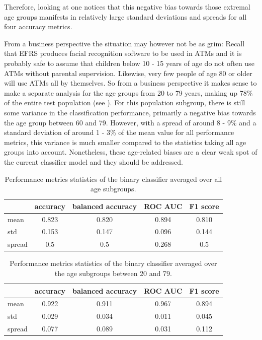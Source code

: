 \documentclass{article}
\begin{document}
Therefore, looking at  one notices that this negative bias towards those extremal age groups manifests in relatively large standard deviations and spreads for all four accuracy metrics.

From a business perspective the situation may however not be as grim: Recall that EFRS produces facial recognition software to be used in ATMs and it is probably safe to assume that children below 10 - 15 years of age do not often use ATMs without parental supervision. Likewise, very few people of age 80 or older will use ATMs all by themselves. So from a business perspective it makes sense to make a separate analysis for the age groups from 20 to 79 years, making up 78\% of the entire test population (see ). For this population subgroup, there is still some variance in the classification performance, primarily a negative bias towards the age group between 60 and 79. However, with a spread of around 8 - 9\% and a standard deviation of around 1 - 3\% of the mean value for all performance metrics, this variance is much smaller compared to the statistics taking all age groups into account. Nonetheless, these age-related biases are a clear weak spot of the current classifier model and they should be addressed.

\begin{table}[h!]
\begin{center}
\caption{Performance metrics statistics of the binary classifier averaged over all age subgroups.}
\label{tab:agestats_all}
\begin{tabular}{| l | c | c | c | c |}
\hline\hline
& accuracy & balanced accuracy & ROC AUC & F1 score\\
\hline\hline
mean & 0.823 & 0.820 & 0.894 & 0.810 \\
std & 0.153 & 0.147 & 0.096 & 0.144 \\
spread & 0.5 & 0.5 & 0.268 & 0.5 \\
\hline\hline
\end{tabular}
\end{center}
\end{table}
\FloatBarrier

\begin{table}[h!]
\begin{center}
\caption{Performance metrics statistics of the binary classifier averaged over the age subgroups between 20 and 79.}
\label{tab:agestats_filtered}
\begin{tabular}{| l | c | c | c | c |}
\hline\hline
& accuracy & balanced accuracy & ROC AUC & F1 score\\
\hline\hline
mean & 0.922 & 0.911 & 0.967 & 0.894 \\
std & 0.029 & 0.034 & 0.011 & 0.045 \\
spread & 0.077 & 0.089 & 0.031 & 0.112 \\
\hline\hline
\end{tabular}
\end{center}
\end{table}
\FloatBarrier
\end{document}
